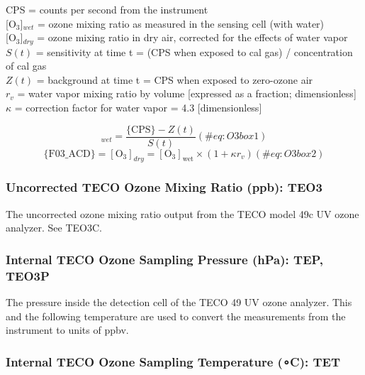\documentclass[
  english,
]{book}
\begin{document}
CPS = counts per second from the
instrument\\
{[}O\(_{3}\){]}\(_{wet}\) = ozone mixing ratio as measured in the
sensing cell (with water)\\
{[}O\(_{3}\){]}\(_{dry}\) = ozone mixing ratio in dry air, corrected for
the effects of water vapor\\
\(S(t)\) = sensitivity at time t = (CPS when exposed to cal gas) /
concentration of cal gas\\
\(Z(t)\) = background at time t = CPS when exposed to zero-ozone air\\
\(r_v\) = water vapor mixing ratio by
volume
{[}expressed as a fraction; dimensionless{]}\\
\(\kappa\) = correction factor for water vapor = 4.3 {[}dimensionless{]}

\begin{equation}
[\mathrm{O}_{3}]_{wet}=\frac{\mathrm{\{CPS\}}-Z(t)}{S(t)}
(\#eq:O3box1)
\end{equation} \begin{equation}
\mathrm{\{F03\_ACD\}}=[\mathrm{O_{3}}]_{dry} = \mathrm{[O_{3}]_{wet}}\times(1+\kappa r_{v})
(\#eq:O3box2)
\end{equation}

\hypertarget{te03}{%
\subsubsection*{Uncorrected TECO Ozone Mixing Ratio (ppb):
TEO3}\label{te03}}

The uncorrected ozone mixing ratio output from the TECO model 49c UV
ozone analyzer. See TEO3C.

\hypertarget{tep}{%
\subsubsection*{Internal TECO Ozone Sampling Pressure (hPa): TEP,
TEO3P}\label{tep}}

The pressure inside the detection cell of the TECO 49 UV ozone analyzer.
This and the following temperature are used to convert the measurements
from the instrument to units of ppbv.

\hypertarget{tet}{%
\subsubsection*{\texorpdfstring{Internal TECO Ozone Sampling Temperature
({∘C}):
TET}{Internal TECO Ozone Sampling Temperature (∘C): TET}}\label{tet}}
\end{document}
